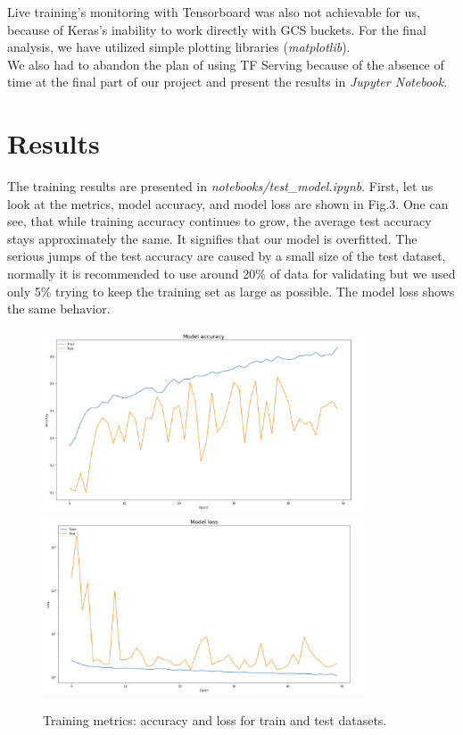\documentclass[
	12pt, %
]{fphw}
\begin{document}
Live training's monitoring with Tensorboard was also not achievable for us, because of Keras's inability to work directly with GCS buckets. For the final analysis, we have utilized simple plotting libraries (\textit{matplotlib}).\\

We also had to abandon the plan of using TF Serving because of the absence of time at the final part of our project and present the results in \textit{Jupyter Notebook}.

\pagebreak
\section{Results}

The training results are presented in \textit{notebooks/test\_model.ipynb}. First, let us look at the metrics, model accuracy, and model loss are shown in Fig.3. One can see, that while training accuracy continues to grow, the average test accuracy stays approximately the same. It signifies that our model is overfitted. The serious jumps of the test accuracy are caused by a small size of the test dataset, normally it is recommended to use around 20\% of data for validating but we used only 5\% trying to keep the training set as large as possible. The model loss shows the same behavior.\\

\begin{figure}[H]
	\center \includegraphics[width=0.85\textwidth]{model_acc}
	\center \includegraphics[width=0.85\textwidth]{model_loss}
	\caption{Training metrics: accuracy and loss for train and test datasets.}
\end{figure}
\end{document}
